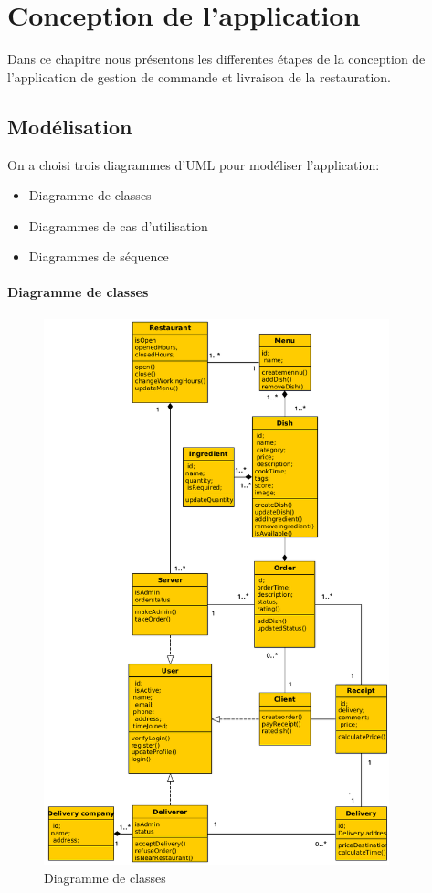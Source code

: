 \documentclass[french, a4paper, 12pt]{report}
\begin{document}
\newpage
\chapter{Conception de l'application} Dans ce chapitre nous présentons les differentes étapes de la conception de l'application de gestion de commande et livraison de la restauration.
	\section{Modélisation} On a choisi trois diagrammes d’UML pour modéliser l'application:
		\begin{itemize}
			\item Diagramme de classes
			\item Diagrammes de cas d’utilisation
			\item Diagrammes de séquence
		\end{itemize}
		
		\newpage
		\subsubsection{Diagramme de classes}
			\begin{figure}[!h]
  				\center
  				\includegraphics[width=10cm]{classdiag.png}
  				\caption{Diagramme de classes}
  				\label{fig:classdiag}
			\end{figure}
			
\end{document}
